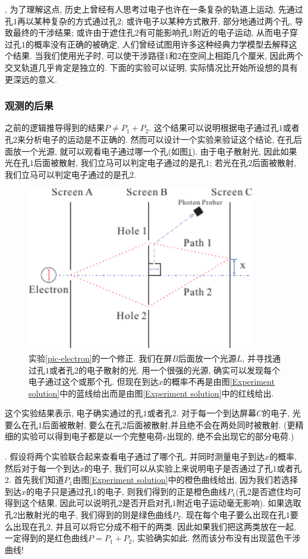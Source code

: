 \documentclass[a4paper,11pt]{book}
\begin{document}
, 为了理解这点, 历史上曾经有人思考过电子也许在一条复杂的轨道上运动, 先通过孔$1$再以某种复杂的方式通过孔$2$; 或许电子以某种方式散开, 部分地通过两个孔, 导致最终的干涉结果; 或许由于遮住孔$2$有可能影响孔$1$附近的电子运动, 从而电子穿过孔$1$的概率没有正确的被确定, 人们曾经试图用许多这种经典力学模型去解释这个结果. 当我们使用光子时, 可以使干涉路径$1$和$2$在空间上相距几个厘米, 因此两个交叉轨道几乎肯定是独立的. 下面的实验可以证明, 实际情况比开始所设想的具有更深远的意义.
\subsubsection*{观测的后果}
之前的逻辑推导得到的结果$P\neq P_1+P_2$. 这个结果可以说明根据电子通过孔$1$或者孔$2$来分析电子的运动是不正确的. 然而可以设计一个实验来验证这个结论, 在孔后面放一个光源, 就可以观看电子通过哪一个孔(如图\ref{Choose Experiment}). 由于电子散射光, 因此如果光在孔$1$后面被散射, 我们立马可以判定电子通过的是孔$1$; 若光在孔$2$后面被散射, 我们立马可以判定电子通过的是孔$2$.
\begin{figure}[H]
  \centering
  \includegraphics[width=10cm]{fig7.pdf}
  \caption{实验\ref{pic-electron}的一个修正. 我们在屏$B$后面放一个光源$L$, 并寻找通过孔$1$或者孔$2$的电子散射的光. 用一个很强的光源, 确实可以发现每个电子通过这个或那个孔. 但现在到达$x$的概率不再是由图\ref{Experiment solution}中的蓝线给出而是由图\ref{Experiment solution}中的红线给出.}\label{Choose Experiment}
\end{figure}
这个实验结果表示, 电子确实通过的孔$1$或者孔$2$. 对于每一个到达屏幕$C$的电子, 光要么在孔$1$后面被散射, 要么在孔$2$后面被散射,并且绝不会在两处同时被散射. (更精细的实验可以得到电子都是以一个完整电荷$e$出现的, 绝不会出现它的部分电荷.)

. 假设将两个实验联合起来查看电子通过了哪个孔, 并同时测量电子到达$x$的概率, 然后对于每一个到达$x$的电子, 我们可以从实验上来说明电子是否通过了孔$1$或者孔$2$. 首先我们知道$P_1$由图\ref{Experiment solution}中的橙色曲线给出, 因为我们若选择到达$x$的电子只是通过孔$1$的电子, 则我们得到的正是橙色曲线$P_1$(孔$2$是否遮住均可得到这个结果, 因此可以说明孔$2$是否开启对孔$1$附近电子运动毫无影响). 如果选取孔$2$出散射光的电子, 我们得到的则是绿色曲线$P_2$. 现在每个电子要么出现在孔$1$要么出现在孔$2$, 并且可以将它分成不相干的两类. 因此如果我们把这两类放在一起, 一定得到的是红色曲线$P=P_1+P_2$, 实验确实如此. 然而该分布没有出现蓝色干涉曲线!
\end{document}
